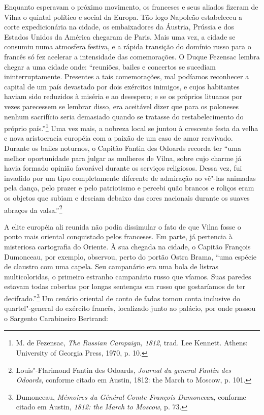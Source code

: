 Enquanto esperavam o próximo movimento, os franceses e seus aliados
fizeram de Vilna o quintal político e social da Europa. Tão logo
Napoleão estabeleceu a corte expedicionária na cidade, os embaixadores
da Áustria, Prússia e dos Estados Unidos da América chegaram de Paris.
Mais uma vez, a cidade se consumiu numa atmosfera festiva, e a rápida
transição do domínio russo para o francês só fez acelerar a intensidade
das comemorações. O Duque Fezensac lembra chegar a uma cidade onde:
``reuniões, bailes e concertos se sucediam ininterruptamente. Presentes
a tais comemorações, mal podíamos reconhecer a capital de um país
devastado por dois exércitos inimigos, e cujos habitantes haviam sido
reduzidos à miséria e ao desespero; e se os próprios lituanos por vezes
parecessem se lembrar disso, era aceitável dizer que para os poloneses
nenhum sacrifício seria demasiado quando se tratasse do restabelecimento
do próprio país.''\footnote{M. de Fezensac, \emph{The Russian Campaign,
  1812}, trad. Lee Kennett. Athens: University of Georgia Press, 1970,
  p. 10.} Uma vez mais, a nobreza local se juntou à crescente festa da
velha e nova aristocracia européia com a paixão de um caso de amor
reavivado. Durante os bailes noturnos, o Capitão Fantin des Odoards
recorda ter ``uma melhor oportunidade para julgar as mulheres de Vilna,
sobre cujo charme já havia formado opinião favorável durante os serviços
religiosos. Dessa vez, fui invadido por um tipo completamente diferente
de admiração ao vê"-las animadas pela dança, pelo prazer e pelo
patriotismo e percebi quão brancos e roliços eram os objetos que subiam
e desciam debaixo das cores nacionais durante os suaves abraços da
valsa.''\footnote{Louis"-Flarimond Fantin des Odoards, \emph{Journal du
  general Fantin des Odoards}, conforme citado em Austin, 1812: the
  March to Moscow, p. 101.}

A elite européia ali reunida não podia dissimular o fato de que Vilna
fosse o ponto mais oriental conquistado pelos franceses. Em parte, já
pertencia à misteriosa cartografia do Oriente. À sua chegada na cidade,
o Capitão François Dumonceau, por exemplo, observou, perto do portão
Ostra Brama, ``uma espécie de claustro com uma capela. Seu campanário
era uma bola de listras multicoloridas, o primeiro estranho campanário
russo que víamos. Suas paredes estavam todas cobertas por longas
sentenças em russo que gostaríamos de ter decifrado.''\footnote{Dumonceau,
  \emph{Mémoires du Général Comte François Dumonceau}, conforme citado
  em Austin, \emph{1812: the March to Moscow}, p. 73.} Um cenário
oriental de conto de fadas tomou conta inclusive do quartel"-general do
exército francês, localizado junto ao palácio, por onde passou o
Sargento Carabineiro Bertrand:

